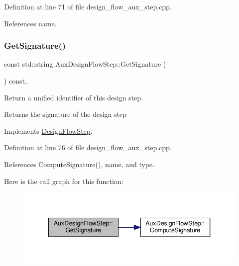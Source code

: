 Definition at line 71 of file design\+\_\+flow\+\_\+aux\+\_\+step.\+cpp.



References name.

\mbox{\label{classAuxDesignFlowStep_a0ed46b87b6526026f9b405f35ba06244}} 
\subsubsection{\texorpdfstring{Get\+Signature()}{GetSignature()}}
{\footnotesize\ttfamily const std\+::string Aux\+Design\+Flow\+Step\+::\+Get\+Signature (\begin{DoxyParamCaption}{ }\end{DoxyParamCaption}) const\hspace{0.3cm}{\ttfamily [override]}, {\ttfamily [virtual]}}



Return a unified identifier of this design step. 

\begin{DoxyReturn}{Returns}
the signature of the design step 
\end{DoxyReturn}


Implements \hyperlink{classDesignFlowStep_ab111e3d4058615c2dedc0505978d4699}{Design\+Flow\+Step}.



Definition at line 76 of file design\+\_\+flow\+\_\+aux\+\_\+step.\+cpp.



References Compute\+Signature(), name, and type.

Here is the call graph for this function\+:
\nopagebreak
\begin{figure}[H]
\begin{center}
\leavevmode
\includegraphics[width=340pt]{db/df5/classAuxDesignFlowStep_a0ed46b87b6526026f9b405f35ba06244_cgraph}
\end{center}
\end{figure}
\mbox{\label{classAuxDesignFlowStep_a7ff8544122f2f0ec2588cdbc5a9fca4a}} 
